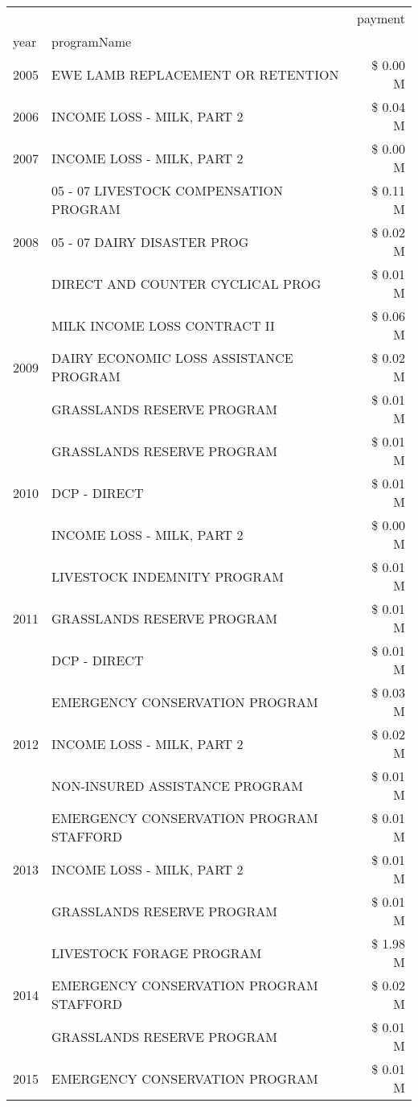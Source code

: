 \begin{tabular}{llr}
\toprule
 &  & payment \\
year & programName &  \\
\midrule
2005 & EWE LAMB REPLACEMENT OR RETENTION & \$ 0.00 M \\
\cline{1-3}
2006 & INCOME LOSS - MILK, PART 2 & \$ 0.04 M \\
\cline{1-3}
2007 & INCOME LOSS - MILK, PART 2 & \$ 0.00 M \\
\cline{1-3}
\multirow[t]{3}{*}{2008} & 05 - 07 LIVESTOCK COMPENSATION PROGRAM & \$ 0.11 M \\
 & 05 - 07 DAIRY DISASTER PROG & \$ 0.02 M \\
 & DIRECT AND COUNTER CYCLICAL PROG & \$ 0.01 M \\
\cline{1-3}
\multirow[t]{3}{*}{2009} & MILK INCOME LOSS CONTRACT II & \$ 0.06 M \\
 & DAIRY ECONOMIC LOSS ASSISTANCE PROGRAM & \$ 0.02 M \\
 & GRASSLANDS RESERVE PROGRAM & \$ 0.01 M \\
\cline{1-3}
\multirow[t]{3}{*}{2010} & GRASSLANDS RESERVE PROGRAM & \$ 0.01 M \\
 & DCP - DIRECT & \$ 0.01 M \\
 & INCOME LOSS - MILK, PART 2 & \$ 0.00 M \\
\cline{1-3}
\multirow[t]{3}{*}{2011} & LIVESTOCK INDEMNITY PROGRAM & \$ 0.01 M \\
 & GRASSLANDS RESERVE PROGRAM & \$ 0.01 M \\
 & DCP - DIRECT & \$ 0.01 M \\
\cline{1-3}
\multirow[t]{3}{*}{2012} & EMERGENCY CONSERVATION PROGRAM & \$ 0.03 M \\
 & INCOME LOSS - MILK, PART 2 & \$ 0.02 M \\
 & NON-INSURED ASSISTANCE PROGRAM & \$ 0.01 M \\
\cline{1-3}
\multirow[t]{3}{*}{2013} & EMERGENCY CONSERVATION PROGRAM STAFFORD & \$ 0.01 M \\
 & INCOME LOSS - MILK, PART 2 & \$ 0.01 M \\
 & GRASSLANDS RESERVE PROGRAM & \$ 0.01 M \\
\cline{1-3}
\multirow[t]{3}{*}{2014} & LIVESTOCK FORAGE PROGRAM & \$ 1.98 M \\
 & EMERGENCY CONSERVATION PROGRAM STAFFORD & \$ 0.02 M \\
 & GRASSLANDS RESERVE PROGRAM & \$ 0.01 M \\
\cline{1-3}
\multirow[t]{3}{*}{2015} & EMERGENCY CONSERVATION PROGRAM & \$ 0.01 M \\

\end{tabular}
